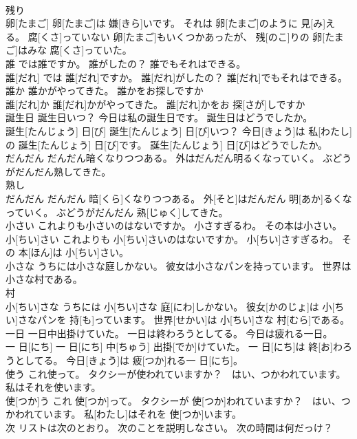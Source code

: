 \documentclass[8pt]{extreport}
\begin{document}
\begin{CJK}{UTF8}{min}
\\	残り 
\\	卵[たまご] 卵[たまご]は 嫌[きら]いです。 それは 卵[たまご]のように 見[み]える。 腐[くさ]っていない 卵[たまご]もいくつかあったが、 残[のこ]りの 卵[たまご]はみな 腐[くさ]っていた。
\\	誰 では誰ですか。 誰がしたの？ 誰でもそれはできる。	
\\	誰[だれ] では 誰[だれ]ですか。 誰[だれ]がしたの？ 誰[だれ]でもそれはできる。
\\	誰か 誰かがやってきた。 誰かをお探しですか	
\\	誰[だれ]か 誰[だれ]かがやってきた。 誰[だれ]かをお 探[さが]しですか
\\	誕生日 誕生日いつ？ 今日は私の誕生日です。 誕生日はどうでしたか。	
\\	誕生[たんじょう] 日[び] 誕生[たんじょう] 日[び]いつ？ 今日[きょう]は 私[わたし]の 誕生[たんじょう] 日[び]です。 誕生[たんじょう] 日[び]はどうでしたか。
\\	だんだん だんだん暗くなりつつある。 外はだんだん明るくなっていく。 ぶどうがだんだん熟してきた。	
\\	熟し 
\\	だんだん だんだん 暗[くら]くなりつつある。 外[そと]はだんだん 明[あか]るくなっていく。 ぶどうがだんだん 熟[じゅく]してきた。
\\	小さい これよりも小さいのはないですか。 小さすぎるわ。 その本は小さい。	
\\	小[ちい]さい これよりも 小[ちい]さいのはないですか。 小[ちい]さすぎるわ。 その 本[ほん]は 小[ちい]さい。
\\	小さな うちには小さな庭しかない。 彼女は小さなパンを持っています。 世界は小さな村である。	
\\	村 
\\	小[ちい]さな うちには 小[ちい]さな 庭[にわ]しかない。 彼女[かのじょ]は 小[ちい]さなパンを 持[も]っています。 世界[せかい]は 小[ちい]さな 村[むら]である。
\\	一日 一日中出掛けていた。 一日は終わろうとしてる。 今日は疲れる一日。	
\\	一 日[にち] 一 日[にち] 中[ちゅう] 出掛[でか]けていた。 一 日[にち]は 終[お]わろうとしてる。 今日[きょう]は 疲[つか]れる一 日[にち]。
\\	使う これ使って。 タクシーが使われていますか？　はい、つかわれています。 私はそれを使います。	
\\	使[つか]う これ 使[つか]って。 タクシーが 使[つか]われていますか？　はい、つかわれています。 私[わたし]はそれを 使[つか]います。
\\	次 リストは次のとおり。 次のことを説明しなさい。 次の時間は何だっけ？	

\end{CJK}
\end{document}
